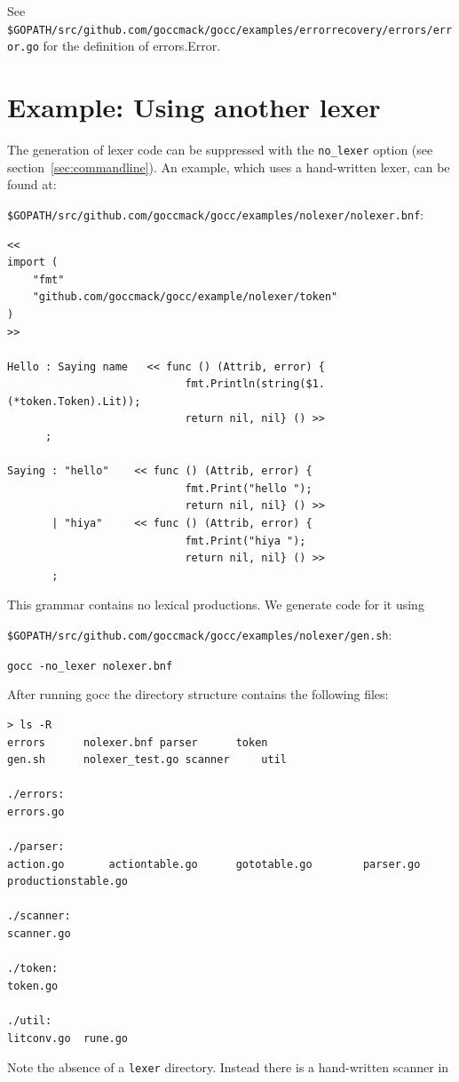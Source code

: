 \documentclass[12pt]{article}
\begin{document}
	See \verb|$GOPATH/src/github.com/goccmack/gocc/examples/errorrecovery/errors/error.go| for the definition of errors.Error.

\section{Example: Using another lexer} \label{sec:no lexer}
	The generation of lexer code can be suppressed with the \verb|no_lexer| option (see section~\ref{sec:commandline}). An example,
	which uses a hand-written lexer, can be found at:

	\verb|$GOPATH/src/github.com/goccmack/gocc/examples/nolexer/nolexer.bnf|:

	\begin{verbatim}
<<
import (
    "fmt"
    "github.com/goccmack/gocc/example/nolexer/token"
)
>>

Hello : Saying name   << func () (Attrib, error) {
                            fmt.Println(string($1.(*token.Token).Lit));
                            return nil, nil} () >>
      ;

Saying : "hello"    << func () (Attrib, error) {
                            fmt.Print("hello ");
                            return nil, nil} () >>
       | "hiya"     << func () (Attrib, error) {
                            fmt.Print("hiya ");
                            return nil, nil} () >>
       ;
    \end{verbatim}

    This grammar contains no lexical productions. We generate code for it using

    \verb|$GOPATH/src/github.com/goccmack/gocc/examples/nolexer/gen.sh|:

    \verb|gocc -no_lexer nolexer.bnf|

    After running gocc the directory structure contains the following files:
    \begin{verbatim}
> ls -R
errors		nolexer.bnf	parser		token
gen.sh		nolexer_test.go	scanner		util

./errors:
errors.go

./parser:
action.go		actiontable.go		gototable.go		parser.go		productionstable.go

./scanner:
scanner.go

./token:
token.go

./util:
litconv.go	rune.go
    \end{verbatim}

    Note the absence of a \verb|lexer| directory. Instead there is a hand-written scanner in
\end{document}
